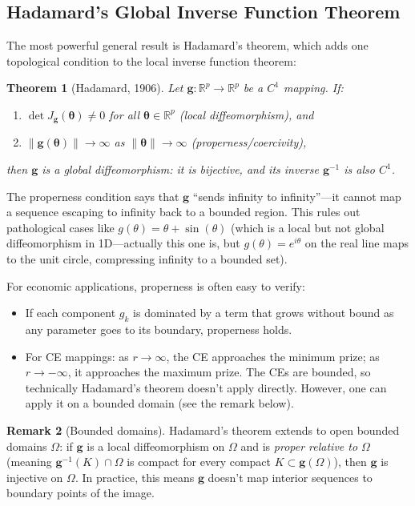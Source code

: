 \documentclass[11pt,a4paper]{article}
\newtheorem{theorem}{Theorem}[section]
\theoremstyle{definition}
\newtheorem{remark}[theorem]{Remark}
\newcommand{\btheta}{\boldsymbol{\theta}}
\begin{document}
\subsection{Hadamard's Global Inverse Function Theorem}

The most powerful general result is Hadamard's theorem, which adds one
topological condition to the local inverse function theorem:

\begin{theorem}[Hadamard, 1906]
\label{thm:hadamard}
Let $\mathbf{g}: \mathbb{R}^p \to \mathbb{R}^p$ be a $C^1$ mapping. If:
\begin{enumerate}
    \item $\det J_{\mathbf{g}}(\btheta) \neq 0$ for all $\btheta \in
    \mathbb{R}^p$ \emph{(local diffeomorphism)}, and
    \item $\|\mathbf{g}(\btheta)\| \to \infty$ as
    $\|\btheta\| \to \infty$ \emph{(properness/coercivity)},
\end{enumerate}
then $\mathbf{g}$ is a global diffeomorphism: it is bijective, and its inverse
$\mathbf{g}^{-1}$ is also $C^1$.
\end{theorem}

The properness condition says that $\mathbf{g}$ ``sends infinity to
infinity''---it cannot map a sequence escaping to infinity back to a bounded
region. This rules out pathological cases like $g(\theta) = \theta +
\sin(\theta)$ (which is a local but not global diffeomorphism in 1D---actually
this one is, but $g(\theta) = e^{i\theta}$ on the real line maps to the
unit circle, compressing infinity to a bounded set).

For economic applications, properness is often easy to verify:
\begin{itemize}
    \item If each component $g_k$ is dominated by a term that grows without
    bound as any parameter goes to its boundary, properness holds.
    \item For CE mappings: as $r \to \infty$, the CE approaches the minimum
    prize; as $r \to -\infty$, it approaches the maximum prize. The CEs are
    bounded, so technically Hadamard's theorem doesn't apply directly. However,
    one can apply it on a bounded domain (see the remark below).
\end{itemize}

\begin{remark}[Bounded domains]
Hadamard's theorem extends to open bounded domains $\Omega$: if $\mathbf{g}$ is
a local diffeomorphism on $\Omega$ and is \emph{proper relative to $\Omega$}
(meaning $\mathbf{g}^{-1}(K) \cap \Omega$ is compact for every compact
$K \subset \mathbf{g}(\Omega)$), then $\mathbf{g}$ is injective on $\Omega$.
In practice, this means $\mathbf{g}$ doesn't map interior sequences to boundary
points of the image.
\end{remark}
\end{document}
